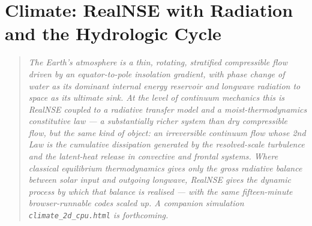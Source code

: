\chapter{Climate: RealNSE with Radiation and the Hydrologic Cycle}

\begin{quote}\itshape
The Earth's atmosphere is a thin, rotating, stratified compressible flow
driven by an equator-to-pole insolation gradient, with phase change of
water as its dominant internal energy reservoir and longwave radiation to
space as its ultimate sink. At the level of continuum mechanics this is
RealNSE coupled to a radiative transfer model and a moist-thermodynamics
constitutive law --- a substantially richer system than dry compressible
flow, but the same kind of object: an irreversible continuum flow whose
2nd Law is the cumulative dissipation generated by the resolved-scale
turbulence and the latent-heat release in convective and frontal systems.
Where classical equilibrium thermodynamics gives only the gross radiative
balance between solar input and outgoing longwave, RealNSE gives the dynamic
process by which that balance is realised --- with the same fifteen-minute
browser-runnable codes scaled up. A companion simulation
\texttt{climate\_2d\_cpu.html} is forthcoming.
\end{quote}

\appendix


